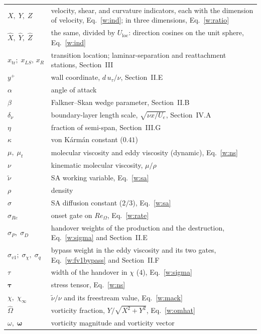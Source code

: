 \documentclass[conf]{new-aiaa}
\begin{document}
{\begin{longtable*}{@{}l @{\quad=\quad} p{4.5in}@{}}
$X,\;Y,\;Z$ & velocity, shear, and curvature indicators, each with the dimension of velocity, Eq.~\eqref{w:ind}; in three dimensions, Eq.~\eqref{w:ratio} \\
$\hat X,\;\hat Y,\;\hat Z$ & the same, divided by $U_\mathrm{loc}$: direction cosines on the unit sphere, Eq.~\eqref{w:ind} \\
$x_\mathrm{tr};\;x_{LS},\,x_R$ & transition location; laminar-separation and reattachment stations, Section~III \\
$y^+$ & wall coordinate, $d\,u_\tau/\nu$, Section~II.E \\
$\alpha$ & angle of attack \\
$\beta$ & Falkner--Skan wedge parameter, Section~II.B \\
$\delta_\nu$ & boundary-layer length scale, $\sqrt{\nu x/U_e}$, Section~IV.A \\
$\eta$ & fraction of semi-span, Section~III.G \\
$\kappa$ & von K\'arm\'an constant ($0.41$) \\
$\mu,\;\mu_t$ & molecular viscosity and eddy viscosity (dynamic), Eq.~\eqref{w:ns} \\
$\nu$ & kinematic molecular viscosity, $\mu/\rho$ \\
$\tilde\nu$ & SA working variable, Eq.~\eqref{w:sa} \\
$\rho$ & density \\
$\sigma$ & SA diffusion constant ($2/3$), Eq.~\eqref{w:sa} \\
$\sigma_{Re}$ & onset gate on $Re_\Omega$, Eq.~\eqref{w:rate} \\
$\sigma_P,\;\sigma_D$ & handover weights of the production and the destruction, Eq.~\eqref{w:sigma} and Section~II.E \\
$\sigma_{v1};\;\sigma_\chi,\;\sigma_q$ & bypass weight in the eddy viscosity and its two gates, Eq.~\eqref{w:fv1bypass} and Section~II.F \\
$\tau$ & width of the handover in $\chi$ ($4$), Eq.~\eqref{w:sigma} \\
$\boldsymbol\tau$ & stress tensor, Eq.~\eqref{w:ns} \\
$\chi,\;\chi_\infty$ & $\tilde\nu/\nu$ and its freestream value, Eq.~\eqref{w:mack} \\
$\hat\Omega$ & vorticity fraction, $Y/\sqrt{X^2+Y^2}$, Eq.~\eqref{w:omhat} \\
$\omega,\;\boldsymbol\omega$ & vorticity magnitude and vorticity vector \\
\end{longtable*}}
\end{document}
